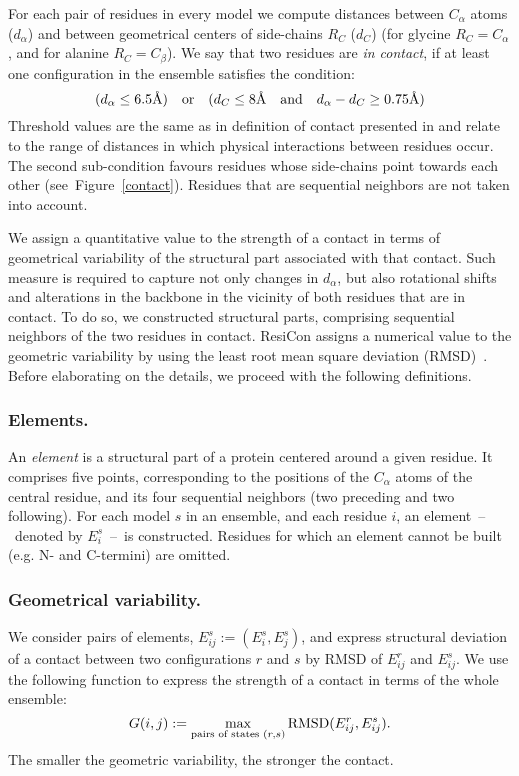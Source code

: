 For each pair of residues in every model we compute distances between $C_\alpha$ atoms ($d_\alpha$) and between geometrical centers of side-chains $R_C$ ($d_C$) (for glycine $R_C = C_\alpha$, and for alanine $R_C = C_\beta$).
We say that two residues are \emph{in contact}, if at least one configuration in the ensemble satisfies the condition:
\begin{equation}
(d_\alpha \leq 6.5\mbox{\normalfont\AA})\quad \text{or} \quad (d_C \leq 8\mbox{\normalfont\AA}\quad \text{and} \quad d_\alpha - d_C \geq 0.75\mbox{\normalfont\AA})
\label{condition}
\end{equation}
Threshold values are the same as in definition of contact presented in \cite{daniluk2011novel} and relate to the range of distances in which physical interactions between residues occur.
The second sub-condition favours residues whose side-chains point towards each other (see~Figure~\ref{contact}). 
Residues that are sequential neighbors are not taken into account.

We assign a quantitative value to the strength of a contact in terms of geometrical variability of the structural part associated with that contact.
Such measure is required to capture not only changes in $d_\alpha$, but also rotational shifts and alterations in the backbone in the vicinity of both residues that are in contact.
To do so, we constructed structural parts, comprising sequential neighbors of the two residues in contact.
ResiCon assigns a numerical value to the geometric variability by using the least root mean square deviation (RMSD)~\cite{kabsch1976solution}.
Before elaborating on the details, we proceed with the following definitions.

\subsubsection*{Elements.}
An \emph{element} is a structural part of a protein centered around a given residue.
It comprises five points, corresponding to the positions of the $C_\alpha$ atoms of the central residue, and its four sequential neighbors (two preceding and two following).
For each model $s$ in an ensemble, and each residue $i$, an element~--~denoted by $E_i^s$~--~is constructed.
Residues for which an element cannot be built (e.g. N- and C-termini) are omitted.

\subsubsection*{Geometrical variability.}
We consider pairs of elements, $E_{ij}^s := ( E_i^s , E_j^s )$, and express structural deviation of a contact between two configurations $r$ and $s$ by RMSD of $E_{ij}^r$ and $E_{ij}^s$.
We use the following function to express the strength of a contact in terms of the whole ensemble:
\begin{displaymath}
G(i,j) := \max_{\text{pairs of states }\\(r,s)} \text{RMSD}(E_{ij}^r,E_{ij}^s) .
\end{displaymath}
The smaller the geometric variability, the stronger the contact.

